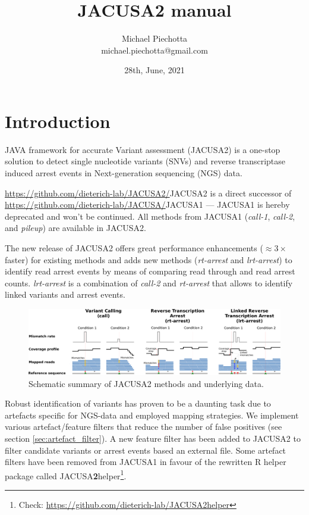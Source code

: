 \documentclass[10pt,a4paper,final]{article}
\title{JACUSA2 manual}
\author{Michael Piechotta \\ michael.piechotta@gmail.com}
\date{28th, June, 2021}
\begin{document}
\newcommand{\call}[1]{\textit{call-#1}\xspace}
\newcommand{\pileup}{\textit{pileup}\xspace}
\newcommand{\rtarrest}{\textit{rt-arrest}\xspace}
\newcommand{\lrtarrest}{\textit{lrt-arrest}\xspace}
\maketitle
\tableofcontents
\listoftodos
\newpage
\section{Introduction}
JAVA framework for accurate Variant assessment (JACUSA2) is a one-stop solution to detect single
nucleotide variants (SNVs) and reverse transcriptase induced arrest events in Next-generation
sequencing (NGS) data.

\url{https://github.com/dieterich-lab/JACUSA2/}{JACUSA2} is a direct successor of 
\url{https://github.com/dieterich-lab/JACUSA/}{JACUSA1} --- JACUSA1 is hereby deprecated and won't be 
continued. All methods from JACUSA1 (\call{1}, \call{2}, and \pileup) are available in JACUSA2.

The new release of JACUSA2 offers great performance enhancements ($\approx3\times$ faster) for existing methods
and adds new methods (\rtarrest and \lrtarrest) to identify read arrest events by means of comparing 
read through and read arrest counts. \lrtarrest is a combination of \call{2} and \rtarrest that 
allows to identify linked variants and arrest events.

\begin{figure}[ht]
  \centering
  \includegraphics[width=\textwidth]{figures/jacusa_methods_cropped}
  \caption{Schematic summary of JACUSA2 methods and underlying data.}
  \label{fig:methods}
\end{figure}

Robust identification of variants has proven to be a daunting task due to artefacts specific for
NGS-data and employed mapping strategies. We implement various artefact/feature filters that reduce
the number of false positives (see section \ref{sec:artefact_filter}). A new feature filter has been
added to JACUSA2 to filter candidate variants or arrest events based an external file.
Some artefact filters have been removed from JACUSA1 in favour of the rewritten R helper package called 
JACUSA\textbf{2}helper\footnote{Check: \url{https://github.com/dieterich-lab/JACUSA2helper}}.
\end{document}
